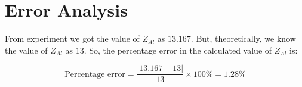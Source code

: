 \section{Error Analysis}
	From experiment we got the value of $Z_{Al}$ as $13.167$. But, theoretically, we know the value of $Z_{Al}$ as $13$. So, the percentage error in the calculated value of $Z_{Al}$ is:

	$$\text{Percentage error} = \frac{|13.167-13|}{13}\times100\% = 1.28\%$$